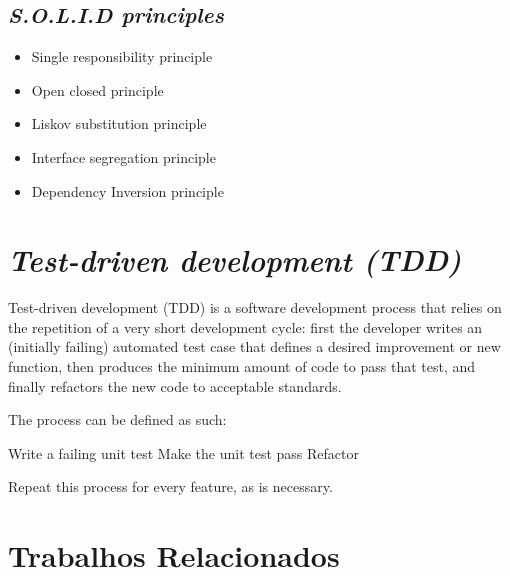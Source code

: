 \documentclass[12pt]{article}
\begin{document}
\subsection{\textit{S.O.L.I.D principles}} \label{sec:solid}
\begin{itemize}
	\item Single responsibility principle
	\item Open closed principle
	\item Liskov substitution principle
	\item Interface segregation principle
	\item Dependency Inversion principle
\end{itemize}

\section{\textsl{Test-driven development (TDD)}} \label{sec:tdd}
Test-driven development (TDD) is a software development process that relies on the repetition of a very short development cycle: first the developer writes an (initially failing) automated test case that defines a desired improvement or new function, then produces the minimum amount of code to pass that test, and finally refactors the new code to acceptable standards.

The process can be defined as such:

    Write a failing unit test
    Make the unit test pass
    Refactor

Repeat this process for every feature, as is necessary.

\section{Trabalhos Relacionados} \label{sec:trabalhosrelacionados}



\end{document}
